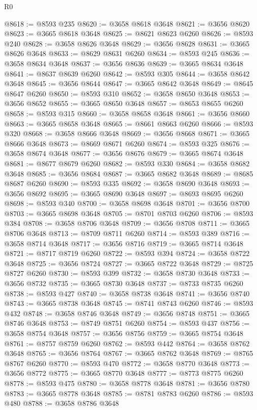 \begin{lexlean}{R0}
\begin{coremodule}
@8618 := @8593 @235
@8620 := @3658 @8618 @3648
@8621 := @3656 @8620
@8623 := @3665 @8618 @3648
@8625 := @8621 @8623 @6260
@8626 := @8593 @240
@8628 := @3658 @8626 @3648
@8629 := @3656 @8628
@8631 := @3665 @8626 @3648
@8633 := @8629 @8631 @6260
@8634 := @8593 @245
@8636 := @3658 @8634 @3648
@8637 := @3656 @8636
@8639 := @3665 @8634 @3648
@8641 := @8637 @8639 @6260
@8642 := @8593 @305
@8644 := @3658 @8642 @3648
@8645 := @3656 @8644
@8647 := @3665 @8642 @3648
@8649 := @8645 @8647 @6260
@8650 := @8593 @310
@8652 := @3658 @8650 @3648
@8653 := @3656 @8652
@8655 := @3665 @8650 @3648
@8657 := @8653 @8655 @6260
@8658 := @8593 @315
@8660 := @3658 @8658 @3648
@8661 := @3656 @8660
@8663 := @3665 @8658 @3648
@8665 := @8661 @8663 @6260
@8666 := @8593 @320
@8668 := @3658 @8666 @3648
@8669 := @3656 @8668
@8671 := @3665 @8666 @3648
@8673 := @8669 @8671 @6260
@8674 := @8593 @325
@8676 := @3658 @8674 @3648
@8677 := @3656 @8676
@8679 := @3665 @8674 @3648
@8681 := @8677 @8679 @6260
@8682 := @8593 @330
@8684 := @3658 @8682 @3648
@8685 := @3656 @8684
@8687 := @3665 @8682 @3648
@8689 := @8685 @8687 @6260
@8690 := @8593 @335
@8692 := @3658 @8690 @3648
@8693 := @3656 @8692
@8695 := @3665 @8690 @3648
@8697 := @8693 @8695 @6260
@8698 := @8593 @340
@8700 := @3658 @8698 @3648
@8701 := @3656 @8700
@8703 := @3665 @8698 @3648
@8705 := @8701 @8703 @6260
@8706 := @8593 @384
@8708 := @3658 @8706 @3648
@8709 := @3656 @8708
@8711 := @3665 @8706 @3648
@8713 := @8709 @8711 @6260
@8714 := @8593 @389
@8716 := @3658 @8714 @3648
@8717 := @3656 @8716
@8719 := @3665 @8714 @3648
@8721 := @8717 @8719 @6260
@8722 := @8593 @394
@8724 := @3658 @8722 @3648
@8725 := @3656 @8724
@8727 := @3665 @8722 @3648
@8729 := @8725 @8727 @6260
@8730 := @8593 @399
@8732 := @3658 @8730 @3648
@8733 := @3656 @8732
@8735 := @3665 @8730 @3648
@8737 := @8733 @8735 @6260
@8738 := @8593 @427
@8740 := @3658 @8738 @3648
@8741 := @3656 @8740
@8743 := @3665 @8738 @3648
@8745 := @8741 @8743 @6260
@8746 := @8593 @432
@8748 := @3658 @8746 @3648
@8749 := @3656 @8748
@8751 := @3665 @8746 @3648
@8753 := @8749 @8751 @6260
@8754 := @8593 @437
@8756 := @3658 @8754 @3648
@8757 := @3656 @8756
@8759 := @3665 @8754 @3648
@8761 := @8757 @8759 @6260
@8762 := @8593 @442
@8764 := @3658 @8762 @3648
@8765 := @3656 @8764
@8767 := @3665 @8762 @3648
@8769 := @8765 @8767 @6260
@8770 := @8593 @470
@8772 := @3658 @8770 @3648
@8773 := @3656 @8772
@8775 := @3665 @8770 @3648
@8777 := @8773 @8775 @6260
@8778 := @8593 @475
@8780 := @3658 @8778 @3648
@8781 := @3656 @8780
@8783 := @3665 @8778 @3648
@8785 := @8781 @8783 @6260
@8786 := @8593 @480
@8788 := @3658 @8786 @3648

\end{coremodule}
\end{lexlean}
